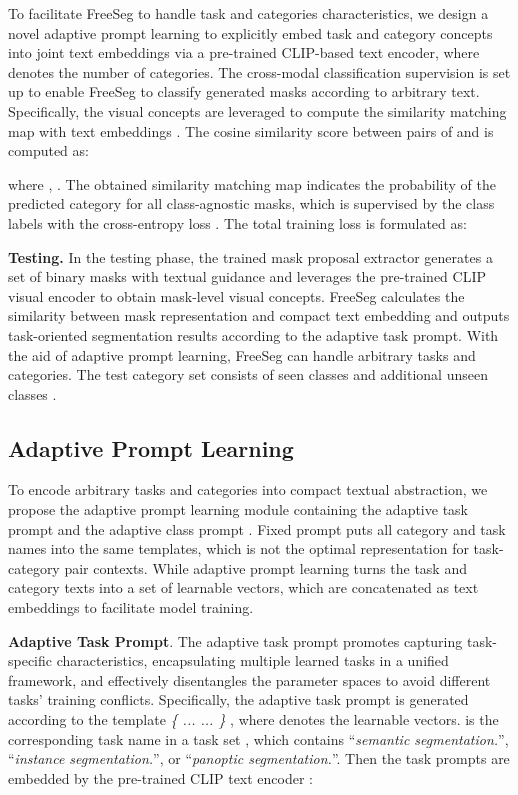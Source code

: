 \documentclass[10pt,twocolumn,letterpaper]{article}
\begin{document}
To facilitate FreeSeg to handle task and categories characteristics, we design a novel adaptive prompt learning to explicitly embed task and category concepts into joint text embeddings  via a pre-trained CLIP-based text encoder, where  denotes the number of categories. 
The cross-modal classification supervision is set up to enable FreeSeg to classify generated masks according to arbitrary text.
Specifically, the visual concepts  are leveraged to compute the similarity matching map with text embeddings . The cosine similarity score  between pairs of  and   is computed as:

where , .
The obtained similarity matching map indicates the probability of the predicted category for all class-agnostic masks, which is supervised by the class labels with the cross-entropy loss .
The total training loss is formulated as:



\textbf{Testing.}
In the testing phase, the trained mask proposal extractor generates a set of binary masks with textual guidance and leverages the pre-trained CLIP visual encoder to obtain mask-level visual concepts.
FreeSeg calculates the similarity between mask representation and compact text embedding and outputs task-oriented segmentation results according to the adaptive task prompt.
With the aid of adaptive prompt learning, FreeSeg can handle arbitrary tasks and categories. The test category set  consists of seen classes  and additional unseen classes .

 
\subsection{Adaptive Prompt Learning}
To encode arbitrary tasks and categories into compact textual abstraction, we propose the adaptive prompt learning module containing the adaptive task prompt  and the adaptive class prompt . 
Fixed prompt puts all category and task names into the same templates, which is not the optimal representation for task-category pair contexts. 
While adaptive prompt learning turns the task and category texts into a set of learnable vectors, which are concatenated as text embeddings to facilitate model training.

\textbf{Adaptive Task Prompt}. 
The adaptive task prompt promotes capturing task-specific characteristics, encapsulating multiple learned tasks in a unified framework, and effectively disentangles the parameter spaces to avoid different tasks’ training conflicts.
Specifically, the adaptive task prompt  is generated according to the template \textit{\{  ...  ...   \} }, where  denotes the learnable vectors.
 is the corresponding task name in a task set , which contains ``\textit{semantic segmentation.}'', ``\textit{instance segmentation.}'', or ``\textit{panoptic segmentation.}''. Then the task prompts are embedded by the pre-trained CLIP text encoder :
\end{document}
